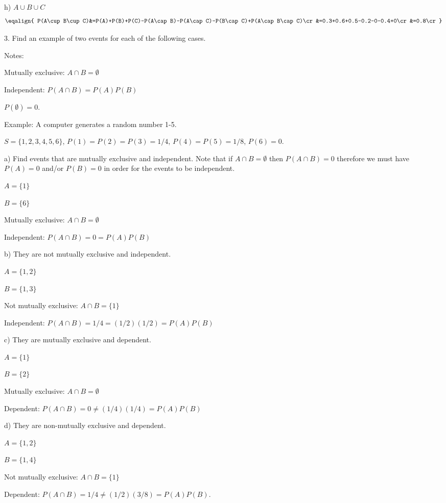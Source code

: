 \bigskip
h) $A\cup B\cup C$
$$\eqalign{
P(A\cup B\cup C)&=P(A)+P(B)+P(C)-P(A\cap B)-P(A\cap C)-P(B\cap C)+P(A\cap B\cap C)\cr
&=0.3+0.6+0.5-0.2-0-0.4+0\cr
&=0.8\cr
}$$

\vfill
\eject

3. Find an example of two events for each of the following cases.

\bigskip
Notes:\par
Mutually exclusive: $A\cap B=\emptyset$\par
Independent: $P(A\cap B)=P(A)P(B)$\par
$P(\emptyset)=0$.

\bigskip
Example: A computer generates a random number 1-5.\par
$S=\{1,2,3,4,5,6\}$, $P(1)=P(2)=P(3)=1/4$, $P(4)=P(5)=1/8$, $P(6)=0$.

\bigskip
a) Find events that are mutually exclusive and independent.
Note that if
$A\cap B=\emptyset$ then $P(A\cap B)=0$ therefore we must have
$P(A)=0$ and/or $P(B)=0$ in order for the events to be independent.\par
$A=\{1\}$\par
$B=\{6\}$\par
Mutually exclusive: $A\cap B=\emptyset$\par
Independent: $P(A\cap B)=0=P(A)P(B)$

\bigskip
b) They are not mutually exclusive and independent.\par
$A=\{1,2\}$\par
$B=\{1,3\}$\par
Not mutually exclusive: $A\cap B=\{1\}$\par
Independent: $P(A\cap B)=1/4=(1/2)(1/2)=P(A)P(B)$

\bigskip
c) They are mutually exclusive and dependent.\par
$A=\{1\}$\par
$B=\{2\}$\par
Mutually exclusive: $A\cap B=\emptyset$\par
Dependent: $P(A\cap B)=0\ne(1/4)(1/4)=P(A)P(B)$

\bigskip
d) They are non-mutually exclusive and dependent.\par
$A=\{1,2\}$\par
$B=\{1,4\}$\par
Not mutually exclusive: $A\cap B=\{1\}$\par
Dependent: $P(A\cap B)=1/4\ne(1/2)(3/8)=P(A)P(B)$.

\vfill
\eject

